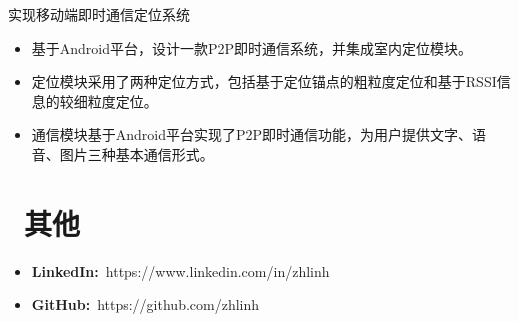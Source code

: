\documentclass{resume}
\begin{document}
\setlength{\parindent}{2em}实现移动端即时通信定位系统
\begin{onehalfspacing}
\begin{itemize}[leftmargin=5em]
  \item 基于Android平台，设计一款P2P即时通信系统，并集成室内定位模块。
  \item 定位模块采用了两种定位方式，包括基于定位锚点的粗粒度定位和基于RSSI信息的较细粒度定位。
  \item 通信模块基于Android平台实现了P2P即时通信功能，为用户提供文字、语音、图片三种基本通信形式。
\end{itemize}
\end{onehalfspacing}


\section{\faEnvelopeO\ 其他}
\begin{itemize}[parsep=0.5ex]
  \item \textbf{LinkedIn:}\ https://www.linkedin.com/in/zhlinh
  \item \textbf{GitHub:}\ https://github.com/zhlinh
\end{itemize}

%
%
\end{document}
